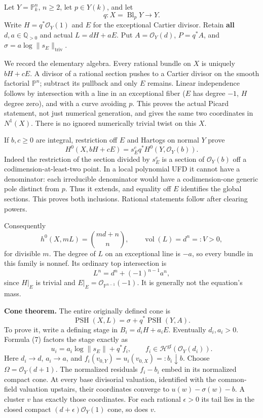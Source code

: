 \documentclass[
  10pt,
]{article}
\begin{document}
Let \(Y=\mathbb P^n_k\), \(n\ge2\), let \(p\in Y(k)\), and let
\[q:X=\operatorname{Bl}_pY\longrightarrow Y.\] Write
\(H=q^*\mathcal O_Y(1)\) and \(E\) for the exceptional Cartier divisor.
Retain \textbf{all} \(d,a\in\mathbb Q_{>0}\) and actual \(L=dH+aE\). Put
\(A=\mathcal O_Y(d)\), \(P=q^*A\), and
\(\sigma=a\log\|s_E\|_{\mathrm{triv}}\).

We record the elementary algebra. Every rational bundle on \(X\) is
uniquely \(bH+cE\). A divisor of a rational section pushes to a Cartier
divisor on the smooth factorial \(\mathbb P^n\); subtract its pullback
and only \(E\) remains. Linear independence follows by intersection with
a line in an exceptional fiber (\(E\) has degree \(-1\), \(H\) degree
zero), and with a curve avoiding \(p\). This proves the actual Picard
statement, not just numerical generation, and gives the same two
coordinates in \(N^1(X)\). There is no ignored numerically trivial twist
on this \(X\).

If \(b,c\ge0\) are integral, restriction off \(E\) and Hartogs on normal
\(Y\) prove
\[H^0(X,bH+cE)=s_E^c q^*H^0(Y,\mathcal O_Y(b)).                       \tag{7}\]
Indeed the restriction of the section divided by \(s_E^c\) is a section
of \(\mathcal O_Y(b)\) off a codimension-at-least-two point. In a local
polynomial UFD it cannot have a denominator: each irreducible
denominator would have a codimension-one generic pole distinct from
\(p\). Thus it extends, and equality off \(E\) identifies the global
sections. This proves both inclusions. Rational statements follow after
clearing powers.

Consequently
\[h^0(X,mL)=\binom{md+n}{n},\qquad \operatorname{vol}(L)=d^n=:V>0,     \tag{8}\]
for divisible \(m\). The degree of \(L\) on an exceptional line is
\(-a\), so every bundle in this family is nonnef. Its ordinary top
intersection is \[L^n=d^n+(-1)^{n-1}a^n,\] since \(H|_E\) is trivial and
\(E|_E=\mathcal O_{\mathbb P^{n-1}}(-1)\). It is generally not the
equation's mass.

\textbf{Cone theorem.} The entire originally defined cone is
\[\operatorname{PSH}(X,L)=\sigma+q^*\operatorname{PSH}(Y,A).          \tag{9}\]
To prove it, write a defining stage in \(B_i=d_iH+a_iE\). Eventually
\(d_i,a_i>0\). Formula (7) factors the stage exactly as
\[u_i=a_i\log\|s_E\|+q^*f_i,\qquad f_i\in\mathcal H^{\mathrm{gf}}(\mathcal O_Y(d_i)).\]
Here \(d_i\to d\), \(a_i\to a\), and
\(f_i(v_{0,Y})=u_i(v_{0,X})=:b_i\downarrow b\). Choose
\(\Omega=\mathcal O_Y(d+1)\). The normalized residuals \(f_i-b_i\) embed
in its normalized compact cone. At every base divisorial valuation,
identified with the common-field valuation upstairs, their coordinates
converge to \(u(w)-\sigma(w)-b\). A cluster \(v\) has exactly those
coordinates. For each rational \(\epsilon>0\) its tail lies in the
closed compact \((d+\epsilon)\mathcal O_Y(1)\) cone, so does \(v\).
\end{document}
